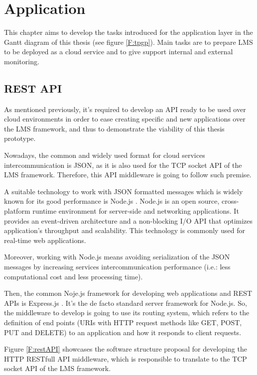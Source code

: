 \chapter{Application}\label{D:application}

This chapter aims to develop the tasks introduced for the application layer in the Gantt diagram of this thesis (see figure \ref{F:tpgp}). Main tasks are to prepare LMS to be deployed as a cloud service and to give support internal and external monitoring.

\section{REST API}

As mentioned previously, it's required to develop an API ready to be used over cloud environments in order to ease creating specific and new applications over the LMS framework, and thus to demonstrate the viability of this thesis prototype.

Nowadays, the common and widely used format for cloud services intercommunication is JSON, as it is also used for the TCP socket API of the LMS framework. Therefore, this API middleware is going to follow such premise.

A suitable technology to work with JSON formatted messages which is widely known for its good performance is Node.js \cite{nodejs}. Node.js is an open source, cross-platform runtime environment for server-side and networking applications. It provides an event-driven architecture and a non-blocking I/O API that optimizes application's throughput and scalability. This technology is commonly used for real-time web applications. 

Moreover, working with Node.js means avoiding serialization of the JSON messages by increasing services intercommunication performance (i.e.: less computational cost and less processing time). 

Then, the common Noje.js framework for developing web applications and REST APIs is Express.js \cite{expressjs}. It's the de facto standard server framework for Node.js. So, the middleware to develop is going to use its routing system, which refers to the definition of end points (URIs with HTTP request methods like GET, POST, PUT and DELETE) to an application and how it responds to client requests.

Figure \ref{F:restAPI} showcases the software structure proposal for developing the HTTP RESTfull API middleware, which is responsible to translate to the TCP socket API of the LMS framework.

